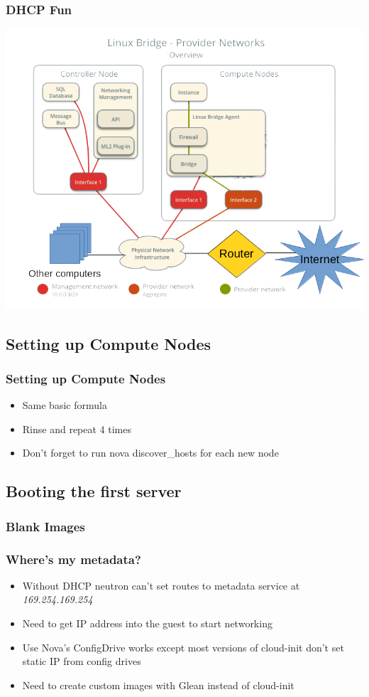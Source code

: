 \documentclass[aspectratio=169,11pt,hyperref={colorlinks=true}]{beamer}
\begin{document}
\begin{frame}
    \frametitle{DHCP Fun}
    \centering
    \includegraphics[width=.7\textwidth]{network-topology-with-router.png}
\end{frame}

\subsection{Setting up Compute Nodes}
\begin{frame}
    \frametitle{Setting up Compute Nodes}
    \begin{itemize}
        \item Same basic formula
        \item Rinse and repeat 4 times
        \item Don't forget to run nova discover\_hosts for each new node
    \end{itemize}
\end{frame}


\subsection{Booting the first server}
\begin{frame}
    
\end{frame}

\begin{frame}
    \frametitle{Blank Images}
    
\end{frame}

\begin{frame}
    \frametitle{Where's my metadata?}
    \begin{itemize}
        \item Without DHCP neutron can't set routes to metadata service at \textit{169.254.169.254}
        \item Need to get IP address into the guest to start networking
        \item Use Nova's ConfigDrive works except most versions of cloud-init don't set static IP from config drives
        \item Need to create custom images with Glean instead of cloud-init
    \end{itemize}
\end{frame}
\end{document}
